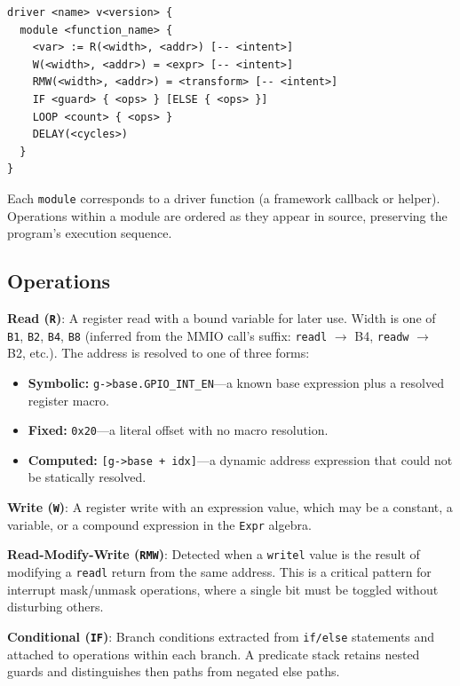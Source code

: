 \documentclass[sigconf,review]{acmart}
\begin{document}
\begin{lstlisting}[language=ris]
driver <name> v<version> {
  module <function_name> {
    <var> := R(<width>, <addr>) [-- <intent>]
    W(<width>, <addr>) = <expr> [-- <intent>]
    RMW(<width>, <addr>) = <transform> [-- <intent>]
    IF <guard> { <ops> } [ELSE { <ops> }]
    LOOP <count> { <ops> }
    DELAY(<cycles>)
  }
}
\end{lstlisting}

Each \texttt{module} corresponds to a driver function (a framework callback or helper). Operations within a module are ordered as they appear in source, preserving the program's execution sequence.

\subsection{Operations}

\textbf{Read (\texttt{R})}: A register read with a bound variable for later use. Width is one of \texttt{B1}, \texttt{B2}, \texttt{B4}, \texttt{B8} (inferred from the MMIO call's suffix: \texttt{readl} $\rightarrow$ B4, \texttt{readw} $\rightarrow$ B2, etc.). The address is resolved to one of three forms:

\begin{itemize}
\item \textbf{Symbolic:} \texttt{g->base.GPIO\_INT\_EN}---a known base expression plus a resolved register macro.
\item \textbf{Fixed:} \texttt{0x20}---a literal offset with no macro resolution.
\item \textbf{Computed:} \texttt{[g->base + idx]}---a dynamic address expression that could not be statically resolved.
\end{itemize}

\textbf{Write (\texttt{W})}: A register write with an expression value, which may be a constant, a variable, or a compound expression in the \texttt{Expr} algebra.

\textbf{Read-Modify-Write (\texttt{RMW})}: Detected when a \texttt{writel} value is the result of modifying a \texttt{readl} return from the same address. This is a critical pattern for interrupt mask/unmask operations, where a single bit must be toggled without disturbing others.

\textbf{Conditional (\texttt{IF})}: Branch conditions extracted from \texttt{if/else} statements and attached to operations within each branch. A predicate stack retains nested guards and distinguishes then paths from negated else paths.
\end{document}
